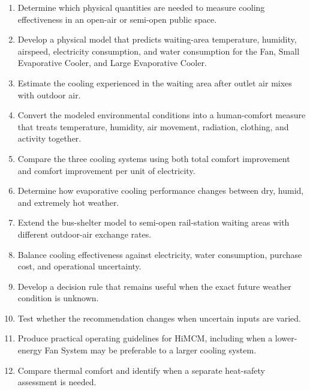 \vspace{8 pt}

\begin{enumerate}

    \item Determine which physical quantities are needed to measure cooling effectiveness in an open-air or semi-open public space.

    \item Develop a physical model that predicts waiting-area temperature, humidity, airspeed, electricity
     consumption, and water consumption for the Fan, Small Evaporative Cooler, and Large Evaporative Cooler.

    \item Estimate the cooling experienced in the waiting area after outlet air mixes with outdoor air.

  \item Convert the modeled environmental conditions into a human-comfort measure that treats temperature,
     humidity, air movement, radiation, clothing, and activity together.

  \item Compare the three cooling systems using both total comfort improvement and comfort improvement per unit
     of electricity.

  \item Determine how evaporative cooling performance changes between dry, humid, and extremely hot weather.
  \item Extend the bus-shelter model to semi-open rail-station waiting areas with different outdoor-air exchange
     rates.

   \item Balance cooling effectiveness against electricity, water consumption, purchase cost, and operational
     uncertainty.

  \item Develop a decision rule that remains useful when the exact future weather condition is unknown.
  \item Test whether the recommendation changes when uncertain inputs are varied.
  \item Produce practical operating guidelines for HiMCM, including when a lower-energy Fan System may be
     preferable to a larger cooling system.

  \item Compare thermal comfort and identify when a separate heat-safety assessment is needed.

\end{enumerate}

